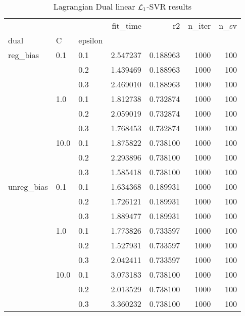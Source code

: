 \begin{table}[H]
\centering
\caption{Lagrangian Dual linear $\protect \mathcal{L}_1$-SVR results}
\label{linear_lagrangian_dual_l1_svr_cv_results}
\begin{tabular}{lllrrrr}
\toprule
           &      &     &  fit\_time &        r2 &  n\_iter &  n\_sv \\
dual & C & epsilon &           &           &         &       \\
\midrule
reg\_bias & 0.1  & 0.1 &  2.547237 &  0.188963 &    1000 &   100 \\
           &      & 0.2 &  1.439469 &  0.188963 &    1000 &   100 \\
           &      & 0.3 &  2.469010 &  0.188963 &    1000 &   100 \\
           & 1.0  & 0.1 &  1.812738 &  0.732874 &    1000 &   100 \\
           &      & 0.2 &  2.059019 &  0.732874 &    1000 &   100 \\
           &      & 0.3 &  1.768453 &  0.732874 &    1000 &   100 \\
           & 10.0 & 0.1 &  1.875822 &  0.738100 &    1000 &   100 \\
           &      & 0.2 &  2.293896 &  0.738100 &    1000 &   100 \\
           &      & 0.3 &  1.585418 &  0.738100 &    1000 &   100 \\
unreg\_bias & 0.1  & 0.1 &  1.634368 &  0.189931 &    1000 &   100 \\
           &      & 0.2 &  1.726121 &  0.189931 &    1000 &   100 \\
           &      & 0.3 &  1.889477 &  0.189931 &    1000 &   100 \\
           & 1.0  & 0.1 &  1.773826 &  0.733597 &    1000 &   100 \\
           &      & 0.2 &  1.527931 &  0.733597 &    1000 &   100 \\
           &      & 0.3 &  2.042411 &  0.733597 &    1000 &   100 \\
           & 10.0 & 0.1 &  3.073183 &  0.738100 &    1000 &   100 \\
           &      & 0.2 &  2.013529 &  0.738100 &    1000 &   100 \\
           &      & 0.3 &  3.360232 &  0.738100 &    1000 &   100 \\
\bottomrule
\end{tabular}
\end{table}
